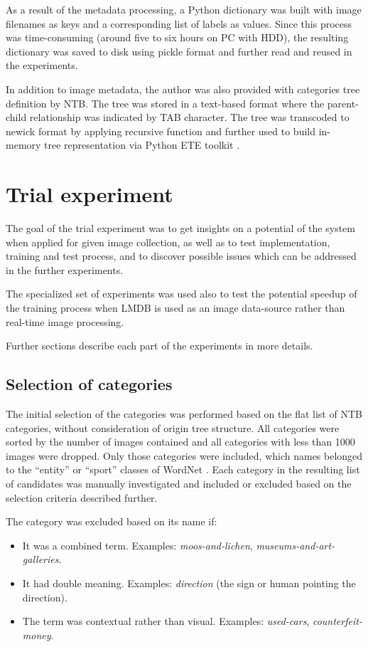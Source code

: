 As a result of the metadata processing, a Python dictionary was built with image filenames as keys and a corresponding list of labels as values. Since this process was time-consuming (around five to six hours on PC with HDD), the resulting dictionary was saved to disk using pickle \cite{pickle} format and further read and reused in the experiments.

In addition to image metadata, the author was also provided with categories tree definition by NTB. The tree was stored in a text-based format where the parent-child relationship was indicated by TAB character. The tree was transcoded to newick \cite{newick} format by applying recursive function and further used to build in-memory tree representation via Python ETE toolkit \cite{ete3}.


\section{Trial experiment}
    The goal of the trial experiment was to get insights on a potential of the system when applied for given image collection, as well as to test implementation, training and test process, and to discover possible issues which can be addressed in the further experiments.
    
    The specialized set of experiments was used also to test the potential speedup of the training process when LMDB is used as an image data-source rather than real-time image processing.
    
    Further sections describe each part of the experiments in more details.
    
    \subsection{Selection of categories}
    \label{sec:trial-cat-selection}
    The initial selection of the categories was performed based on the flat list of NTB categories, without consideration of origin tree structure. All categories were sorted by the number of images contained and all categories with less than 1000 images were dropped. Only those categories were included, which names belonged to the ``entity'' or ``sport'' classes of WordNet \cite{wordnet}. Each category in the resulting list of candidates was manually investigated and included or excluded based on the selection criteria described further.
    
    The category was excluded based on its name if:
    \begin{itemize}
        \item It was a combined term. Examples: \textit{moos-and-lichen}, \textit{museums-and-art-galleries}.
        \item It had double meaning. Examples: \textit{direction} (the sign or human pointing the direction).
        \item The term was contextual rather than visual. Examples: \textit{used-cars}, \textit{counterfeit-money}.
    \end{itemize}
    
